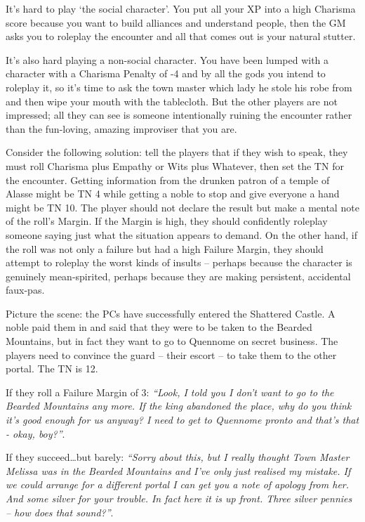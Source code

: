 It's hard to play `the social character'.  You put all your XP into a high Charisma score because you want to build alliances and understand people, then the GM asks you to roleplay the encounter and all that comes out is your natural stutter.

It's also hard playing a non-social character.  You have been lumped with a character with a Charisma Penalty of -4 and by all the gods you intend to roleplay it, so it's time to ask the town master which lady he stole his robe from and then wipe your mouth with the tablecloth.  But the other players are not impressed; all they can see is someone intentionally ruining the encounter rather than the fun-loving, amazing improviser that you are.

Consider the following solution: tell the players that if they wish to speak, they must roll Charisma plus Empathy or Wits plus Whatever, then set the TN for the encounter.  Getting information from the drunken patron of a temple of Alasse might be TN 4 while getting a noble to stop and give everyone a hand might be TN 10.  The player should not declare the result but make a mental note of the roll's Margin.  If the Margin is high, they should confidently roleplay someone saying just what the situation appears to demand.  On the other hand, if the roll was not only a failure but had a high Failure Margin, they should attempt to roleplay the worst kinds of insults -- perhaps because the character is genuinely mean-spirited, perhaps because they are making persistent, accidental faux-pas.

Picture the scene: the PCs have successfully entered the Shattered Castle.  A noble paid them in and said that they were to be taken to the Bearded Mountains, but in fact they want to go to Quennome on secret business.  The players need to convince the guard -- their escort -- to take them to the other portal.  The TN is 12.

If they roll a Failure Margin of 3: \textit{``Look, I told you I don't want to go to the Bearded Mountains any more.  If the king abandoned the place, why do you think it's good enough for us anyway?  I need to get to Quennome pronto and that's that - okay, boy?''}.

If they succeed\ldots but barely: \textit{``Sorry about this, but I really thought Town Master Melissa was in the Bearded Mountains and I've only just realised my mistake.  If we could arrange for a different portal I can get you a note of apology from her.  And some silver for your trouble.  In fact here it is up front.  Three silver pennies -- how does that sound?''}.


